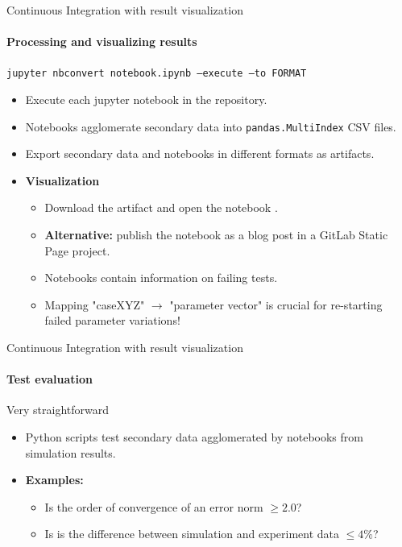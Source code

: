 \documentclass[
	aspectratio=169,%
	color={accentcolor=2d},
	logo=true,%
	colorframetitle=true,%
	]{tudabeamer}
\begin{document}
\begin{frame}{Continuous Integration with result visualization} 
    \framesubtitle{Processing and visualizing results}

    \vfill

    \texttt{jupyter nbconvert notebook.ipynb --execute --to FORMAT}

    \medskip

    \begin{itemize}
        \item Execute each jupyter notebook in the repository.
        \item Notebooks agglomerate secondary data into \texttt{pandas.MultiIndex} CSV files. 
        \item Export secondary data and notebooks in different formats as artifacts.
        \item \textbf{Visualization} 
            \begin{itemize}
                \item Download the artifact and open the notebook \faGraduationCap.
                \item \textbf{Alternative:} publish the notebook as a blog post in a GitLab Static Page project. 
                \item Notebooks contain information on failing tests. 
                \item Mapping "caseXYZ" $\to$ "parameter vector" is crucial for re-starting failed parameter variations! 
            \end{itemize}
    \end{itemize}

\end{frame}


\begin{frame}{Continuous Integration with result visualization} 
    \framesubtitle{Test evaluation}

    \vfill

    Very straightforward 
    \begin{itemize}
        \item Python scripts test secondary data agglomerated by notebooks from simulation results.
        \item \textbf{Examples:} 
            \begin{itemize}
                \item Is the order of convergence of an error norm $\ge 2.0$?
                \item Is is the difference between simulation and experiment data $\le 4\%$? 
            \end{itemize}
    \end{itemize}

\end{frame}
\end{document}
